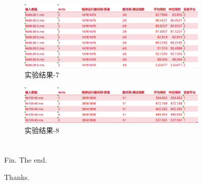 \documentclass[9pt,dvipsnames,table,UTF8,aspectratio=169]{beamer}
\begin{document}
\begin{frame}
	\begin{figure}[H]
		\centering
		\includegraphics[width=0.8\textwidth]{7.png}
		\caption{实验结果-7}\label{results}
	\end{figure}
\end{frame}

\begin{frame}
	\begin{figure}[H]
		\centering
		\includegraphics[width=0.8\textwidth]{8.png}
		\caption{实验结果-8}\label{results}
	\end{figure}
\end{frame}

\appendix
\section{}
\begin{frame}{Fin.}
	The end.

	Thanks.
\end{frame}
\end{document}
